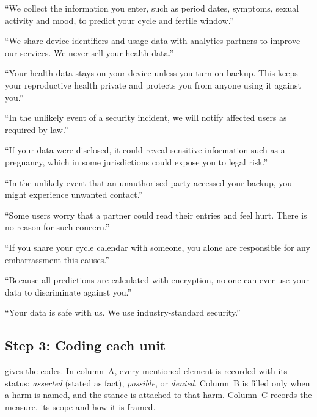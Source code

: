 \begin{description}[leftmargin=2.4em,style=sameline,itemsep=2pt]
  \item[U1] \enquote{We collect the information you enter, such as period
    dates, symptoms, sexual activity and mood, to predict your cycle and
    fertile window.}
  \item[U2] \enquote{We share device identifiers and usage data with analytics
    partners to improve our services. We never sell your health data.}
  \item[U3] \enquote{Your health data stays on your device unless you turn on
    backup. This keeps your reproductive health private and protects you from
    anyone using it against you.}
  \item[U4] \enquote{In the unlikely event of a security incident, we will
    notify affected users as required by law.}
  \item[U5] \enquote{If your data were disclosed, it could reveal sensitive
    information such as a pregnancy, which in some jurisdictions could expose
    you to legal risk.}
  \item[U6] \enquote{In the unlikely event that an unauthorised party accessed
    your backup, you might experience unwanted contact.}
  \item[U7] \enquote{Some users worry that a partner could read their entries
    and feel hurt. There is no reason for such concern.}
  \item[U8] \enquote{If you share your cycle calendar with someone, you alone
    are responsible for any embarrassment this causes.}
  \item[U9] \enquote{Because all predictions are calculated with encryption,
    no one can ever use your data to discriminate against you.}
  \item[U10] \enquote{Your data is safe with us. We use industry-standard
    security.}
\end{description}

\subsection*{Step 3: Coding each unit}

 gives the codes. In column~A, every mentioned element is
recorded with its status: \emph{asserted} (stated as fact), \emph{possible},
or \emph{denied}. Column~B is filled only when a harm is named, and the stance
is attached to that harm. Column~C records the measure, its scope and how it
is framed.

